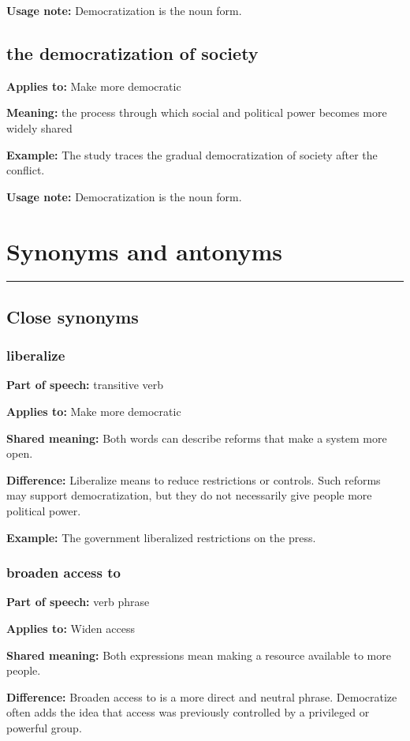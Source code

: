 \documentclass[11pt]{article}
\newcommand{\sectionrule}{\par\vspace{-0.5em}\noindent\textcolor{Accent}{\rule{\linewidth}{0.6pt}}\par}
\begin{document}
\textbf{Usage note:} Democratization is the noun form.

\subsection{the democratization of society}
\textbf{Applies to:} Make more democratic

\textbf{Meaning:} the process through which social and political power becomes more widely shared

\textbf{Example:} The study traces the gradual democratization of society after the conflict.

\textbf{Usage note:} Democratization is the noun form.

\section{Synonyms and antonyms}
\sectionrule
\subsection{Close synonyms}
\subsubsection{liberalize}
\textbf{Part of speech:} transitive verb

\textbf{Applies to:} Make more democratic

\textbf{Shared meaning:} Both words can describe reforms that make a system more open.

\textbf{Difference:} Liberalize means to reduce restrictions or controls. Such reforms may support democratization, but they do not necessarily give people more political power.

\textbf{Example:} The government liberalized restrictions on the press.

\subsubsection{broaden access to}
\textbf{Part of speech:} verb phrase

\textbf{Applies to:} Widen access

\textbf{Shared meaning:} Both expressions mean making a resource available to more people.

\textbf{Difference:} Broaden access to is a more direct and neutral phrase. Democratize often adds the idea that access was previously controlled by a privileged or powerful group.
\end{document}

